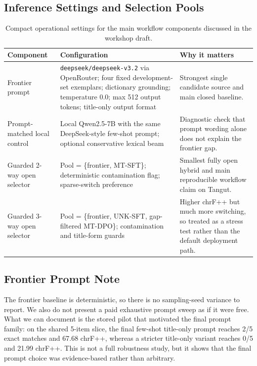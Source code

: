 \documentclass{article}
\begin{document}
\subsection{Inference Settings and Selection Pools}

\begin{table}[H]
\centering
\small
\begin{tabularx}{\textwidth}{@{}l>{\raggedright\arraybackslash}X>{\raggedright\arraybackslash}X@{}}
\toprule
Component & Configuration & Why it matters \\
\midrule
Frontier prompt & \texttt{deepseek/deepseek-v3.2} via OpenRouter; four fixed development-set exemplars; dictionary grounding; temperature 0.0; max 512 output tokens; title-only output format & Strongest single candidate source and main closed baseline. \\
Prompt-matched local control & Local Qwen2.5-7B with the same DeepSeek-style few-shot prompt; optional conservative lexical beam & Diagnostic check that prompt wording alone does not explain the frontier gap. \\
Guarded 2-way open selector & Pool = \{frontier, MT-SFT\}; deterministic contamination flag; sparse-switch preference & Smallest fully open hybrid and main reproducible workflow claim on Tangut. \\
Guarded 3-way open selector & Pool = \{frontier, UNK-SFT, gap-filtered MT-DPO\}; contamination and title-form guards & Higher chrF++ but much more switching, so treated as a stress test rather than the default deployment path. \\
\bottomrule
\end{tabularx}
\caption{Compact operational settings for the main workflow components discussed in the workshop draft.}
\label{tab:settings}
\end{table}

\subsection{Frontier Prompt Note}

The frontier baseline is deterministic, so there is no sampling-seed variance to report. We also do not present a paid exhaustive prompt sweep as if it were free. What we can document is the stored pilot that motivated the final prompt family: on the shared 5-item slice, the final few-shot title-only prompt reaches 2/5 exact matches and 67.68 chrF++, whereas a stricter title-only variant reaches 0/5 and 21.99 chrF++. This is not a full robustness study, but it shows that the final prompt choice was evidence-based rather than arbitrary.
\end{document}
